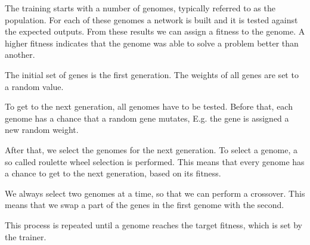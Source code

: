 The training starts with a number of genomes, typically referred to as the population. For each of these genomes a network is built and it is tested against the expected outputs. From these results we can assign a fitness to the genome. A higher fitness indicates that the genome was able to solve a problem better than another. \cite{Anderson1995}

The initial set of genes is the first generation. The weights of all genes are set to a random value.

To get to the next generation, all genomes have to be tested. Before that, each genome has a chance that a random gene mutates, E.g. the gene is assigned a new random weight.

After that, we select the genomes for the next generation. To select a genome, a so called roulette wheel selection is performed. This means that every genome has a chance to get to the next generation, based on its fitness. \cite{Baeck1996}

We always select two genomes at a time, so that we can perform a crossover. This means that we swap a part of the genes in the first genome with the second. \cite{Buckland}

This process is repeated until a genome reaches the target fitness, which is set by the trainer.

